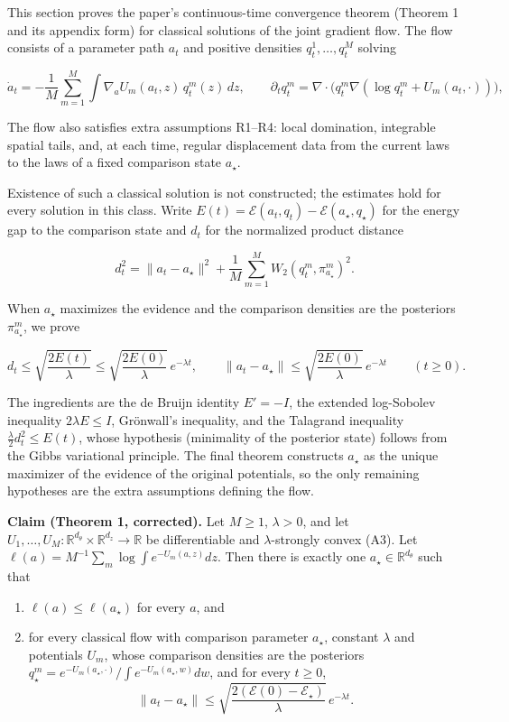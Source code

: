 \documentclass[11pt,a4paper]{report}
\begin{document}
This section proves the paper's continuous-time convergence theorem (Theorem 1 and its appendix form) for classical solutions of the joint gradient flow. The flow consists of a parameter path \(a_t\) and positive densities \(q_t^1,\dots,q_t^M\) solving


\[\dot a_t=-\frac1M\sum_{m=1}^M\int\nabla_aU_m(a_t,z)\,q_t^m(z)\,dz,\qquad\partial_tq_t^m=\nabla\cdot\bigl(q_t^m\nabla(\log q_t^m+U_m(a_t,\cdot))\bigr),\]


The flow also satisfies extra assumptions R1–R4: local domination, integrable spatial tails, and, at each time, regular displacement data from the current laws to the laws of a fixed comparison state \(a_\star\).




Existence of such a classical solution is not constructed; the estimates hold for every solution in this class. Write \(E(t)=\mathcal E(a_t,q_t)-\mathcal E(a_\star,q_\star)\) for the energy gap to the comparison state and \(d_t\) for the normalized product distance


\[d_t^2=\|a_t-a_\star\|^2+\frac1M\sum_{m=1}^MW_2(q_t^m,\pi_{a_\star}^m)^2.\]


When \(a_\star\) maximizes the evidence and the comparison densities are the posteriors \(\pi_{a_\star}^m\), we prove


\[d_t\le\sqrt{\frac{2E(t)}\lambda}\le\sqrt{\frac{2E(0)}\lambda}\,e^{-\lambda t},\qquad\|a_t-a_\star\|\le\sqrt{\frac{2E(0)}\lambda}\,e^{-\lambda t}\qquad(t\ge0).\]


The ingredients are the de Bruijn identity \(E'=-I\), the extended log-Sobolev inequality \(2\lambda E\le I\), Grönwall's inequality, and the Talagrand inequality \(\frac\lambda2d_t^2\le E(t)\), whose hypothesis (minimality of the posterior state) follows from the Gibbs variational principle. The final theorem constructs \(a_\star\) as the unique maximizer of the evidence of the original potentials, so the only remaining hypotheses are the extra assumptions defining the flow.



\textbf{Claim (Theorem 1, corrected).} Let \(M\ge1\), \(\lambda>0\), and let \(U_1,\dots,U_M:\mathbb R^{d_\theta}\times\mathbb R^{d_z}\to\mathbb R\) be differentiable and \(\lambda\)-strongly convex (A3). Let \(\ell(a)=M^{-1}\sum_m\log\int e^{-U_m(a,z)}dz\). Then there is exactly one \(a_\star\in\mathbb R^{d_\theta}\) such that



\begin{enumerate}


\item \(\ell(a)\le\ell(a_\star)\) for every \(a\), and

\item for every classical flow with comparison parameter \(a_\star\), constant \(\lambda\) and potentials \(U_m\), whose comparison densities are the posteriors \(q_\star^m=e^{-U_m(a_\star,\cdot)}/\int e^{-U_m(a_\star,w)}dw\), and for every \(t\ge0\),
\[\|a_t-a_\star\|\le\sqrt{\frac{2(\mathcal E(0)-\mathcal E_\star)}\lambda}\,e^{-\lambda t}.\]

\end{enumerate}
\end{document}
